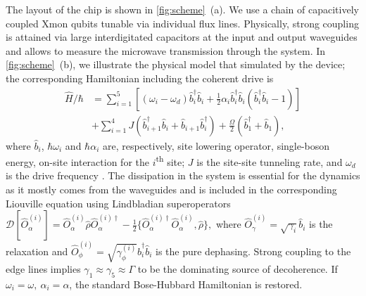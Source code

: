 \documentclass[%
 aps, prl,
 amsmath,amssymb,
 reprint,%
superscriptaddress
]{revtex4-2}
\begin{document}
The layout of the chip is shown in \autoref{fig:scheme}~(a). We use a chain of capacitively coupled Xmon qubits tunable via individual flux lines. Physically, strong coupling is attained via large interdigitated capacitors at the input and output waveguides and allows to measure the microwave transmission through the system. In \autoref{fig:scheme}~(b), we illustrate the physical model that simulated by the device; the corresponding Hamiltonian including the coherent drive is
\begin{equation}
\begin{aligned}
\hat H/\hbar &= \sum_{i=1}^5\left[ (\omega_i - \omega_d) \hat b^\dag_i \hat b_i + \frac{1}{2} \alpha_i \hat b_i^\dag \hat b_i (\hat b^\dag_i \hat b_i - 1)\right]\\
&+\sum_{i=1}^4 J (\hat b^\dag_{i+1} \hat b_i + \hat b_{i+1} \hat b_i^\dag)+\frac{\Omega}{2}(\hat b_1^\dag + \hat b_1),
\end{aligned}\label{eq:bose-hubbard}
\end{equation} 
where $\hat b_i$, $\hbar \omega_i$ and $\hbar\alpha_i$ are, respectively, site lowering operator, single-boson energy, on-site interaction for the $i$\textsuperscript{th} site; $J$ is the site-site tunneling rate, and $\omega_d$ is the drive frequency \cite{egorova2020analog, PhysRevA.102.013707, yanay2020two}. The dissipation in the system is essential for the dynamics as it mostly comes from the waveguides and is included in the corresponding Liouville equation using Lindbladian superoperators $\mathcal D[\hat{O}^{(i)}_\alpha] = \hat{O}^{(i)}_\alpha \hat \rho \hat{O}^{(i)\dag}_\alpha - \frac{1}{2}\{\hat{O}^{(i)\dag}_\alpha \hat{O}^{(i)}_\alpha, \hat \rho\},$ where $\hat{O}^{(i)}_\gamma = \sqrt{\gamma_i} \hat b_i$ is the relaxation and $\hat{O}^{(i)}_\phi = \sqrt{\gamma^{(i)}_\phi} \hat b_i^\dag \hat b_i$ is the pure dephasing. Strong coupling to the edge lines implies $\gamma_1 \approx \gamma_5 \approx \Gamma$ to be the dominating source of decoherence. If $\omega_i = \omega,\ \alpha_i = \alpha$, the standard Bose-Hubbard Hamiltonian is restored.
\end{document}
